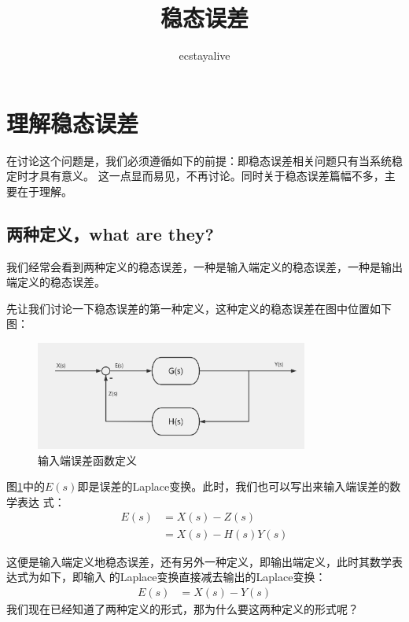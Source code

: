 \documentclass{ctexart}
\begin{document}
\title{稳态误差}
\author{ecstayalive}
\maketitle

\section*{理解稳态误差}

在讨论这个问题是，我们必须遵循如下的前提：即稳态误差相关问题只有当系统稳定时才具有意义。
这一点显而易见，不再讨论。同时关于稳态误差篇幅不多，主要在于理解。

\subsection*{两种定义，what are they?}

我们经常会看到两种定义的稳态误差，一种是输入端定义的稳态误差，一种是输出端定义的稳态误差。

先让我们讨论一下稳态误差的第一种定义，这种定义的稳态误差在图中位置如下图：

\begin{figure}[H]
    \centering
    \includegraphics[width=0.8\textwidth]{./pics/steady_state_error/control_system.png}
    \caption{输入端误差函数定义}
    \label{Fig.1}
\end{figure}

图\ref{Fig.1}中的$E(s)$即是误差的Laplace变换。此时，我们也可以写出来输入端误差的数学表达
式：
\begin{equation}
    \begin{aligned}
        E(s) & = X(s) - Z(s)      \\
             & = X(s) - H(s) Y(s)
    \end{aligned}
\end{equation}

这便是输入端定义地稳态误差，还有另外一种定义，即输出端定义，此时其数学表达式为如下，即输入
的Laplace变换直接减去输出的Laplace变换：
\begin{equation}
    \begin{aligned}
        E(s) & = X(s) - Y(s)
    \end{aligned}
\end{equation}
我们现在已经知道了两种定义的形式，那为什么要这两种定义的形式呢？
\end{document}
